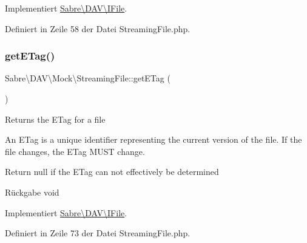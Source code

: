 Implementiert \mbox{\hyperlink{interface_sabre_1_1_d_a_v_1_1_i_file_a3102812af0567c3cfd9cd6c20104bd27}{Sabre\textbackslash{}\+D\+A\+V\textbackslash{}\+I\+File}}.



Definiert in Zeile 58 der Datei Streaming\+File.\+php.

\mbox{\label{class_sabre_1_1_d_a_v_1_1_mock_1_1_streaming_file_a53ac81dd1c660afac1dd3c39c00e4d47}} 
\subsubsection{\texorpdfstring{get\+E\+Tag()}{getETag()}}
{\footnotesize\ttfamily Sabre\textbackslash{}\+D\+A\+V\textbackslash{}\+Mock\textbackslash{}\+Streaming\+File\+::get\+E\+Tag (\begin{DoxyParamCaption}{ }\end{DoxyParamCaption})}

Returns the E\+Tag for a file

An E\+Tag is a unique identifier representing the current version of the file. If the file changes, the E\+Tag M\+U\+ST change.

Return null if the E\+Tag can not effectively be determined

\begin{DoxyReturn}{Rückgabe}
void 
\end{DoxyReturn}


Implementiert \mbox{\hyperlink{interface_sabre_1_1_d_a_v_1_1_i_file_a2b207a6037dcbd4e7373b977dc60117f}{Sabre\textbackslash{}\+D\+A\+V\textbackslash{}\+I\+File}}.



Definiert in Zeile 73 der Datei Streaming\+File.\+php.

\mbox{\label{class_sabre_1_1_d_a_v_1_1_mock_1_1_streaming_file_a693c21cb705844f3d3defd4484976520}} 
